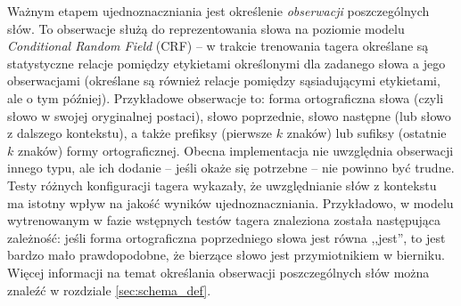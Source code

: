 \documentclass[a4paper,10]{article}
\begin{document}
Ważnym etapem ujednoznaczniania jest określenie \emph{obserwacji} poszczególnych
słów. To obserwacje służą do reprezentowania słowa na poziomie modelu
\emph{Conditional Random Field} (CRF) -- w trakcie trenowania tagera
określane są statystyczne relacje pomiędzy etykietami określonymi
dla zadanego słowa a jego obserwacjami (określane są również relacje
pomiędzy sąsiadującymi etykietami, ale o tym później). Przykładowe obserwacje to:
forma ortograficzna słowa (czyli słowo w swojej oryginalnej postaci),
słowo poprzednie, słowo następne (lub słowo z dalszego kontekstu),
a także prefiksy (pierwsze $k$ znaków) lub sufiksy (ostatnie $k$ znaków)
formy ortograficznej. Obecna implementacja nie uwzględnia obserwacji
innego typu, ale ich dodanie -- jeśli okaże się potrzebne -- nie powinno być trudne.
Testy różnych konfiguracji tagera wykazały, że
uwzględnianie słów z kontekstu ma istotny wpływ na jakość wyników ujednoznaczniania. 
Przykładowo, w modelu wytrenowanym  w fazie wstępnych testów tagera
znaleziona została następująca zależność: jeśli forma ortograficzna
poprzedniego słowa jest równa ,,jest'', to jest bardzo mało prawdopodobne,
że bierzące słowo jest przymiotnikiem w bierniku.
Więcej informacji na temat określania obserwacji poszczególnych
słów można znaleźć w rozdziale \ref{sec:schema_def}. 
\end{document}
